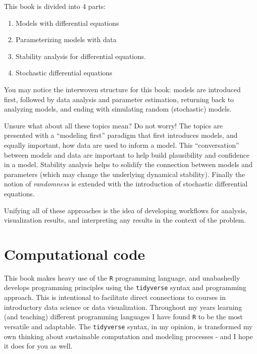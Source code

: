 \documentclass[
]{krantz}
\providecommand{\tightlist}{%
  \setlength{\itemsep}{0pt}\setlength{\parskip}{0pt}}
\theoremstyle{definition}
\theoremstyle{definition}
\theoremstyle{definition}
\theoremstyle{definition}
\theoremstyle{remark}
\begin{document}
This book is divided into 4 parts:

\begin{enumerate}
\def\labelenumi{\arabic{enumi}.}
\tightlist
\item
  Models with differential equations
\item
  Parameterizing models with data
\item
  Stability analysis for differential equations.
\item
  Stochastic differential equations
\end{enumerate}

You may notice the interwoven structure for this book: models are introduced first, followed by data analysis and parameter estimation, returning back to analyzing models, and ending with simulating random (stochastic) models.

Unsure what about all these topics mean? Do not worry! The topics are presented with a ``modeling first'' paradigm that first introduces models, and equally important, how data are used to inform a model. This ``conversation'' between models and data are important to help build plausibility and confidence in a model. Stability analysis helps to solidify the connection between models and parameters (which may change the underlying dynamical stability). Finally the notion of \emph{randomness} is extended with the introduction of stochastic differential equations.

Unifying all of these approaches is the idea of developing workflows for analysis, visualization results, and interpreting any results in the context of the problem.

\hypertarget{computational-code}{%
\section*{Computational code}\label{computational-code}}


This book makes heavy use of the \texttt{R} programming language, and unabashedly develops programming principles using the \texttt{tidyverse} syntax and programming approach. This is intentional to facilitate direct connections to courses in introductory data science or data visualization. Throughout my years learning (and teaching) different programming languages I have found \texttt{R} to be the most versatile and adaptable. The \texttt{tidyverse} syntax, in my opinion, is transformed my own thinking about sustainable computation and modeling processes - and I hope it does for you as well.
\end{document}
